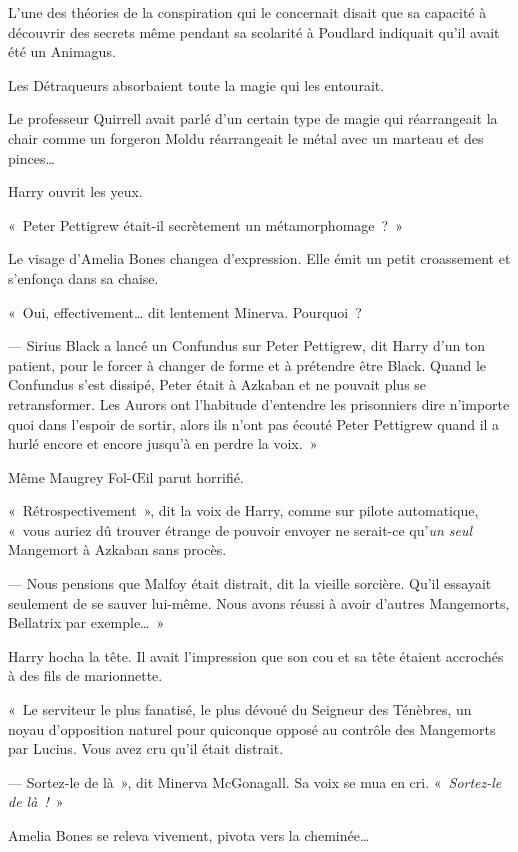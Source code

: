 L'une des théories de la conspiration qui le concernait disait que sa capacité à découvrir des secrets même pendant sa scolarité à Poudlard indiquait qu'il avait été un Animagus.

Les Détraqueurs absorbaient toute la magie qui les entourait.

Le professeur Quirrell avait parlé d'un certain type de magie qui réarrangeait la chair comme un forgeron Moldu réarrangeait le métal avec un marteau et des pinces…

Harry ouvrit les yeux.

«~Peter Pettigrew était-il secrètement un métamorphomage~?~»

Le visage d'Amelia Bones changea d'expression.
Elle émit un petit croassement et s'enfonça dans sa chaise.

«~Oui, effectivement… dit lentement Minerva.
Pourquoi~?

--- Sirius Black a lancé un Confundus sur Peter Pettigrew, dit Harry d'un ton patient, pour le forcer à changer de forme et à prétendre être Black.
Quand le Confundus s'est dissipé, Peter était à Azkaban et ne pouvait plus se retransformer.
Les Aurors ont l'habitude d'entendre les prisonniers dire n'importe quoi dans l'espoir de sortir, alors ils n'ont pas écouté Peter Pettigrew quand il a hurlé encore et encore jusqu'à en perdre la voix.~»

Même Maugrey Fol-Œil parut horrifié.

«~Rétrospectivement~», dit la voix de Harry, comme sur pilote automatique, «~vous auriez dû trouver étrange de pouvoir envoyer ne serait-ce qu'\emph{un seul} Mangemort à Azkaban sans procès.

--- Nous pensions que Malfoy était distrait, dit la vieille sorcière.
Qu'il essayait seulement de se sauver lui-même.
Nous avons réussi à avoir d'autres Mangemorts, Bellatrix par exemple…~»

Harry hocha la tête.
Il avait l'impression que son cou et sa tête étaient accrochés à des fils de marionnette.

«~Le serviteur le plus fanatisé, le plus dévoué du Seigneur des Ténèbres, un noyau d'opposition naturel pour quiconque opposé au contrôle des Mangemorts par Lucius.
Vous avez cru qu'il était distrait.

--- Sortez-le de là~», dit Minerva McGonagall.
Sa voix se mua en cri.
«~\emph{Sortez-le de là~!}~»

Amelia Bones se releva vivement, pivota vers la cheminée…

